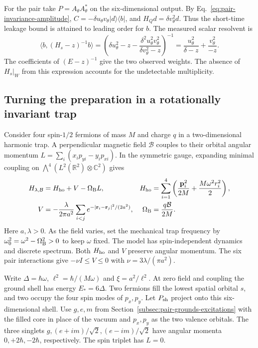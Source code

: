 \documentclass[11pt]{article}
\theoremstyle{definition}
\newcommand{\C}{\mathbb C}
\newcommand{\R}{\mathbb R}
\newcommand{\ket}[1]{\lvert #1\rangle}
\newcommand{\bra}[1]{\langle #1\rvert}
\begin{document}
For the pair take $P=A_\theta A_\theta^*$ on the six-dimensional output. By Eq.~\eqref{eq:pair-invariance-amplitude}, $C=-\delta u_\theta v_\theta\ket{d}\bra{b}$, and $H_Qd=\delta v_\theta^2d$. Thus the short-time leakage bound is attained to leading order for $b$. The measured scalar resolvent is
\[
 \langle b,(H_s-z)^{-1}b\rangle
 =\left(\delta u_\theta^2-z-
   \frac{\delta^2u_\theta^2v_\theta^2}{\delta v_\theta^2-z}\right)^{-1}
 =\frac{u_\theta^2}{\delta-z}+\frac{v_\theta^2}{-z}.
\]
The coefficients of $(E-z)^{-1}$ give the two observed weights. The absence of $H_s|_W$ from this expression accounts for the undetectable multiplicity.

\subsection{Turning the preparation in a rotationally invariant trap}
\label{subsec:orbital-apparatus}

Consider four spin-$1/2$ fermions of mass $M$ and charge $q$ in a two-dimensional harmonic trap. A perpendicular magnetic field $\mathcal B$ couples to their orbital angular momentum $L=\sum_i(x_ip_{yi}-y_ip_{xi})$. In the symmetric gauge, expanding minimal coupling on $\bigwedge^4(L^2(\R^2)\otimes\C^2)$ gives
\begin{align}
 H_{\lambda,\mathcal B}&=H_{\rm ho}+V-\Omega_{\rm B}L, &
 H_{\rm ho}&=\sum_{i=1}^4\left(\frac{\mathbf p_i^2}{2M}+\frac{M\omega^2 r_i^2}{2}\right),\nonumber\\
 V&=-\frac{\lambda}{2\pi a^2}\sum_{i<j}e^{-|\mathbf r_i-\mathbf r_j|^2/(2a^2)}, &
 \Omega_{\rm B}&=\frac{q\mathcal B}{2M}.
 \label{eq:compensated-orbital-parent}
\end{align}
Here $a,\lambda>0$. As the field varies, set the mechanical trap frequency by $\omega_0^2=\omega^2-\Omega_{\rm B}^2>0$ to keep $\omega$ fixed. The model has spin-independent dynamics and discrete spectrum. Both $H_{\rm ho}$ and $V$ preserve angular momentum. The six pair interactions give $-\nu I\le V\le0$ with $\nu=3\lambda/(\pi a^2)$.

Write $\Delta=\hbar\omega$, $\ell^2=\hbar/(M\omega)$ and $\xi=a^2/\ell^2$. At zero field and coupling the ground shell has energy $E_*=6\Delta$. Two fermions fill the lowest spatial orbital $s$, and two occupy the four spin modes of $p_x,p_y$. Let $P_{\rm sh}$ project onto this six-dimensional shell. Use $g,e,m$ from Section~\ref{subsec:pair-grounds-excitations} with the filled core in place of the vacuum and $p_x,p_y$ as the two valence orbitals. The three singlets $g,(e+im)/\sqrt2,(e-im)/\sqrt2$ have angular momenta $0,+2\hbar,-2\hbar$, respectively. The spin triplet has $L=0$.
\end{document}

